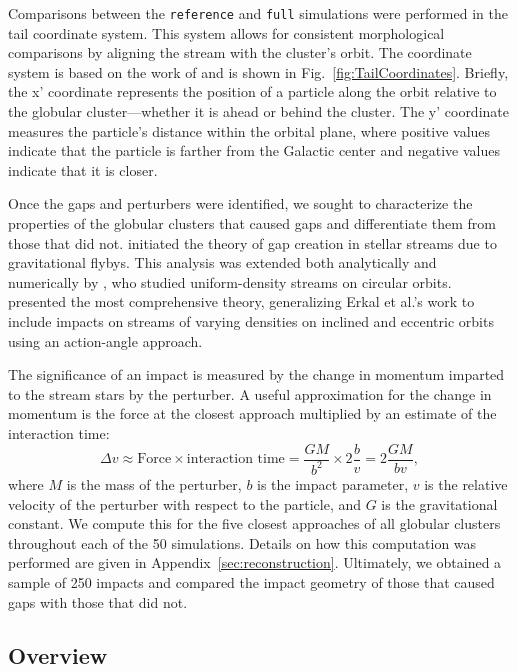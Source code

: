 \documentclass[draft]{aa}
\begin{document}
    Comparisons between the \texttt{reference} and \texttt{full} simulations were performed in the tail coordinate system. This system allows for consistent morphological comparisons by aligning the stream with the cluster's orbit. The coordinate system is based on the work of \citet{2004AJ....127.2753D} and is shown in Fig.~\ref{fig:TailCoordinates}. Briefly, the x' coordinate represents the position of a particle along the orbit relative to the globular cluster—whether it is ahead or behind the cluster. The y' coordinate measures the particle's distance within the orbital plane, where positive values indicate that the particle is farther from the Galactic center and negative values indicate that it is closer.


    Once the gaps and perturbers were identified, we sought to characterize the properties of the globular clusters that caused gaps and differentiate them from those that did not. \citet{2013ApJ...775...90C} initiated the theory of gap creation in stellar streams due to gravitational flybys. This analysis was extended both analytically and numerically by \citet{2015MNRAS.450.1136E}, who studied uniform-density streams on circular orbits. \citet{2016MNRAS.457.3817S} presented the most comprehensive theory, generalizing Erkal et al.'s work to include impacts on streams of varying densities on inclined and eccentric orbits using an action-angle approach.

    The significance of an impact is measured by the change in momentum imparted to the stream stars by the perturber. A useful approximation for the change in momentum is the force at the closest approach multiplied by an estimate of the interaction time: \begin{equation} \label{eq:change_in_momentum} \Delta v \approx \text{Force} \times \text{interaction time} = \frac{GM}{b^2} \times 2\frac{b}{v} = 2\frac{GM}{bv}, \end{equation} where $M$ is the mass of the perturber, $b$ is the impact parameter, $v$ is the relative velocity of the perturber with respect to the particle, and $G$ is the gravitational constant. We compute this for the five closest approaches of all globular clusters throughout each of the 50 simulations. Details on how this computation was performed are given in Appendix~\ref{sec:reconstruction}. Ultimately, we obtained a sample of 250 impacts and compared the impact geometry of those that caused gaps with those that did not.


  \subsection*{Overview}
\end{document}
